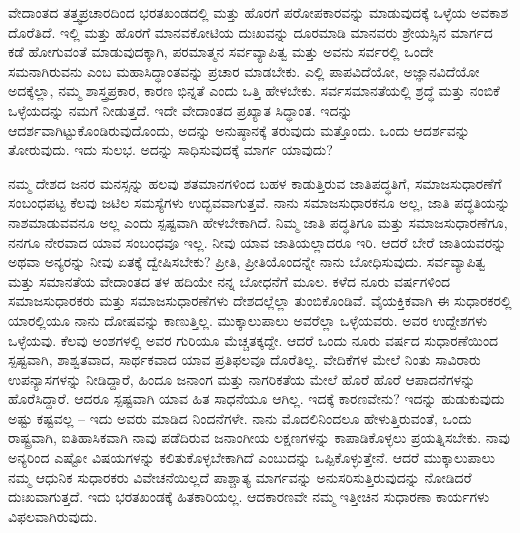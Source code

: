 ವೇದಾಂತದ ತತ್ತ್ವಪ್ರಚಾರದಿಂದ ಭರತಖಂಡದಲ್ಲಿ ಮತ್ತು ಹೊರಗೆ ಪರೋಪಕಾರವನ್ನು ಮಾಡುವುದಕ್ಕೆ ಒಳ್ಳೆಯ ಅವಕಾಶ ದೊರೆತಿದೆ. ಇಲ್ಲಿ ಮತ್ತು ಹೊರಗೆ ಮಾನವಕೋಟಿಯ ದುಃಖವನ್ನು ದೂರಮಾಡಿ ಮಾನವರು ಶ್ರೇಯಸ್ಸಿನ ಮಾರ್ಗದ ಕಡೆ ಹೋಗುವಂತೆ ಮಾಡುವುದಕ್ಕಾಗಿ, ಪರಮಾತ್ಮನ ಸರ್ವವ್ಯಾಪಿತ್ವ ಮತ್ತು ಅವನು ಸರ್ವರಲ್ಲಿ ಒಂದೇ ಸಮನಾಗಿರುವನು ಎಂಬ ಮಹಾಸಿದ್ಧಾಂತವನ್ನು ಪ್ರಚಾರ ಮಾಡಬೇಕು. ಎಲ್ಲಿ ಪಾಪವಿದೆಯೋ, ಅಜ್ಞಾನವಿದೆಯೋ ಅದಕ್ಕೆಲ್ಲಾ, ನಮ್ಮ ಶಾಸ್ತ್ರಪ್ರಕಾರ, ಕಾರಣ ಭಿನ್ನತೆ ಎಂದು ಒತ್ತಿ ಹೇಳಬೇಕು. ಸರ್ವಸಮಾನತೆಯಲ್ಲಿ ಶ್ರದ್ಧೆ ಮತ್ತು ನಂಬಿಕೆ ಒಳ್ಳೆಯದನ್ನು ನಮಗೆ ನೀಡುತ್ತದೆ. ಇದೇ ವೇದಾಂತದ ಪ್ರಖ್ಯಾತ ಸಿದ್ಧಾಂತ. ಇದನ್ನು ಆದರ್ಶವಾಗಿಟ್ಟುಕೊಂಡಿರುವುದೊಂದು, ಅದನ್ನು ಅನುಷ್ಠಾನಕ್ಕೆ ತರುವುದು ಮತ್ತೊಂದು. ಒಂದು ಆದರ್ಶವನ್ನು ತೋರುವುದು. ಇದು ಸುಲಭ. ಅದನ್ನು ಸಾಧಿಸುವುದಕ್ಕೆ ಮಾರ್ಗ ಯಾವುದು?

\vskip 0.2cm

ನಮ್ಮ ದೇಶದ ಜನರ ಮನಸ್ಸನ್ನು ಹಲವು ಶತಮಾನಗಳಿಂದ ಬಹಳ ಕಾಡುತ್ತಿರುವ ಜಾತಿಪದ್ಧತಿಗೆ, ಸಮಾಜಸುಧಾರಣೆಗೆ ಸಂಬಂಧಪಟ್ಟ ಕೆಲವು ಜಟಿಲ ಸಮಸ್ಯೆಗಳು ಉದ್ಭವವಾಗುತ್ತವೆ. ನಾನು ಸಮಾಜಸುಧಾರಕನೂ ಅಲ್ಲ, ಜಾತಿ ಪದ್ಧತಿಯನ್ನು ನಾಶಮಾಡುವವನೂ ಅಲ್ಲ ಎಂದು ಸ್ಪಷ್ಟವಾಗಿ ಹೇಳಬೇಕಾಗಿದೆ. ನಿಮ್ಮ ಜಾತಿ ಪದ್ಧತಿಗೂ ಮತ್ತು ಸಮಾಜಸುಧಾರಣೆಗೂ, ನನಗೂ ನೇರವಾದ ಯಾವ ಸಂಬಂಧವೂ ಇಲ್ಲ. ನೀವು ಯಾವ ಜಾತಿಯಲ್ಲಾದರೂ ಇರಿ. ಆದರೆ ಬೇರೆ ಜಾತಿಯವರನ್ನು ಅಥವಾ ಅನ್ಯರನ್ನು ನೀವು ಏತಕ್ಕೆ ದ್ವೇಷಿಸಬೇಕು? ಪ್ರೀತಿ, ಪ್ರೀತಿಯೊಂದನ್ನೇ ನಾನು ಬೋಧಿಸುವುದು. ಸರ್ವವ್ಯಾಪಿತ್ವ ಮತ್ತು ಸಮಾನತೆಯ ವೇದಾಂತದ ತಳ ಹದಿಯೇ ನನ್ನ ಬೋಧನೆಗೆ ಮೂಲ. ಕಳೆದ ನೂರು ವರ್ಷಗಳಿಂದ ಸಮಾಜಸುಧಾರಕರು ಮತ್ತು ಸಮಾಜಸುಧಾರಣೆಗಳು ದೇಶದಲ್ಲೆಲ್ಲಾ ತುಂಬಿಕೊಂಡಿವೆ. ವೈಯಕ್ತಿಕವಾಗಿ ಈ ಸುಧಾರಕರಲ್ಲಿ ಯಾರಲ್ಲಿಯೂ ನಾನು ದೋಷವನ್ನು ಕಾಣುತ್ತಿಲ್ಲ. ಮುಕ್ಕಾಲುಪಾಲು ಅವರೆಲ್ಲಾ ಒಳ್ಳೆಯವರು. ಅವರ ಉದ್ದೇಶಗಳು ಒಳ್ಳೆಯವು. ಕೆಲವು ಅಂಶಗಳಲ್ಲಿ ಅವರ ಗುರಿಯೂ ಮೆಚ್ಚತಕ್ಕದ್ದೇ. ಆದರೆ ಒಂದು ನೂರು ವರ್ಷದ ಸುಧಾರಣೆಯಿಂದ ಸ್ಪಷ್ಟವಾಗಿ, ಶಾಶ್ವತವಾದ, ಸಾರ್ಥಕವಾದ ಯಾವ ಪ್ರತಿಫಲವೂ ದೊರೆತಿಲ್ಲ. ವೇದಿಕೆಗಳ ಮೇಲೆ ನಿಂತು ಸಾವಿರಾರು ಉಪನ್ಯಾಸಗಳನ್ನು ನೀಡಿದ್ದಾರೆ, ಹಿಂದೂ ಜನಾಂಗ ಮತ್ತು ನಾಗರಿಕತೆಯ ಮೇಲೆ ಹೊರೆ ಹೊರೆ ಆಪಾದನೆಗಳನ್ನು ಹೊರೆಸಿದ್ದಾರೆ. ಆದರೂ ಸ್ಪಷ್ಟವಾಗಿ ಯಾವ ಹಿತ ಸಾಧನೆಯೂ ಆಗಿಲ್ಲ. ಇದಕ್ಕೆ ಕಾರಣವೇನು? ಇದನ್ನು ಹುಡುಕುವುದು ಅಷ್ಟು ಕಷ್ಟವಲ್ಲ – ಇದು ಅವರು ಮಾಡಿದ ನಿಂದನೆಗಳೇ. ನಾನು ಮೊದಲಿನಿಂದಲೂ ಹೇಳುತ್ತಿರುವಂತೆ, ಒಂದು ರಾಷ್ಟ್ರವಾಗಿ, ಐತಿಹಾಸಿಕವಾಗಿ ನಾವು ಪಡೆದಿರುವ ಜನಾಂಗೀಯ ಲಕ್ಷಣಗಳನ್ನು ಕಾಪಾಡಿಕೊಳ್ಳಲು ಪ್ರಯತ್ನಿಸಬೇಕು. ನಾವು ಅನ್ಯರಿಂದ ಎಷ್ಟೋ ವಿಷಯಗಳನ್ನು ಕಲಿತುಕೊಳ್ಳಬೇಕಾಗಿದೆ ಎಂಬುದನ್ನು ಒಪ್ಪಿಕೊಳ್ಳುತ್ತೇನೆ. ಆದರೆ ಮುಕ್ಕಾಲುಪಾಲು ನಮ್ಮ ಆಧುನಿಕ ಸುಧಾರಕರು ವಿವೇಚನೆಯಿಲ್ಲದೆ ಪಾಶ್ಚಾತ್ಯ ಮಾರ್ಗವನ್ನು ಅನುಸರಿಸುತ್ತಿರುವುದನ್ನು ನೋಡಿದರೆ ದುಃಖವಾಗುತ್ತದೆ. ಇದು ಭರತಖಂಡಕ್ಕೆ ಹಿತಕಾರಿಯಲ್ಲ. ಆದಕಾರಣವೇ ನಮ್ಮ ಇತ್ತೀಚಿನ ಸುಧಾರಣಾ ಕಾರ್ಯಗಳು ವಿಫಲವಾಗಿರುವುದು.

\vskip 0.2cm

